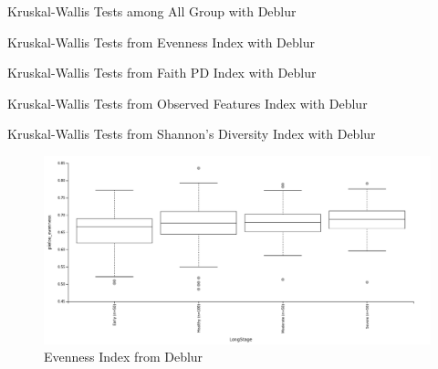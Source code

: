 \documentclass[a4paper]{article}
\begin{document}
            \begin{table}[p]
                \centering
                \caption{Kruskal-Wallis Tests among All Group with Deblur}
                \label{tb:alpha-all-deblur}
            \end{table}

            \begin{table}[p]
                \centering
                \caption{Kruskal-Wallis Tests from Evenness Index with Deblur}
                \label{tb:alpha-evenness-deblur}
            \end{table}

            \begin{table}[p]
                \centering
                \caption{Kruskal-Wallis Tests from Faith PD Index with Deblur}
                \label{tb:alpha-faith-deblur}
            \end{table}

            \begin{table}[p]
                \centering
                \caption{Kruskal-Wallis Tests from Observed Features Index with Deblur}
                \label{tb:alpha-observed-deblur}
            \end{table}

            \begin{table}[p]
                \centering
                \caption{Kruskal-Wallis Tests from Shannon's Diversity Index with Deblur}
                \label{tb:alpha-shannon-deblur}
            \end{table}

            \begin{figure}[p]
                \centering
                \includegraphics[width=0.8 \linewidth]{figures/AlphaDiversity/Deblur/evenness.png}
                \caption{Evenness Index from Deblur}
                \label{fig:evenness-deblur}
            \end{figure}
\end{document}
